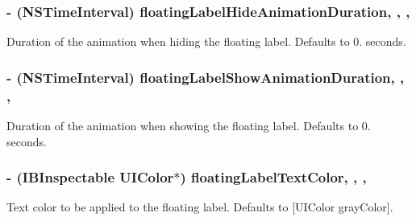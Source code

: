 \subsubsection[{floating\+Label\+Hide\+Animation\+Duration}]{\setlength{\rightskip}{0pt plus 5cm}-\/ (N\+S\+Time\+Interval) floating\+Label\+Hide\+Animation\+Duration\hspace{0.3cm}{\ttfamily [read]}, {\ttfamily [write]}, {\ttfamily [nonatomic]}, {\ttfamily [assign]}}\label{interface_j_v_float_labeled_text_field_a22466509e0b40b1a7a24aa17d949b79b}
Duration of the animation when hiding the floating label. Defaults to 0. seconds. \hypertarget{interface_j_v_float_labeled_text_field_ae2547182365ad7d20fc67623e8148920}{}
\subsubsection[{floating\+Label\+Show\+Animation\+Duration}]{\setlength{\rightskip}{0pt plus 5cm}-\/ (N\+S\+Time\+Interval) floating\+Label\+Show\+Animation\+Duration\hspace{0.3cm}{\ttfamily [read]}, {\ttfamily [write]}, {\ttfamily [nonatomic]}, {\ttfamily [assign]}}\label{interface_j_v_float_labeled_text_field_ae2547182365ad7d20fc67623e8148920}
Duration of the animation when showing the floating label. Defaults to 0. seconds. \hypertarget{interface_j_v_float_labeled_text_field_ac1a4f59f841121c3831be1ee34fcca55}{}
\subsubsection[{floating\+Label\+Text\+Color}]{\setlength{\rightskip}{0pt plus 5cm}-\/ (I\+B\+Inspectable U\+I\+Color$\ast$) floating\+Label\+Text\+Color\hspace{0.3cm}{\ttfamily [read]}, {\ttfamily [write]}, {\ttfamily [nonatomic]}, {\ttfamily [strong]}}\label{interface_j_v_float_labeled_text_field_ac1a4f59f841121c3831be1ee34fcca55}
Text color to be applied to the floating label. Defaults to {\ttfamily \mbox{[}U\+I\+Color gray\+Color\mbox{]}}. \hypertarget{interface_j_v_float_labeled_text_field_a005ea0687f1048ae375072b0eddd842b}{}
